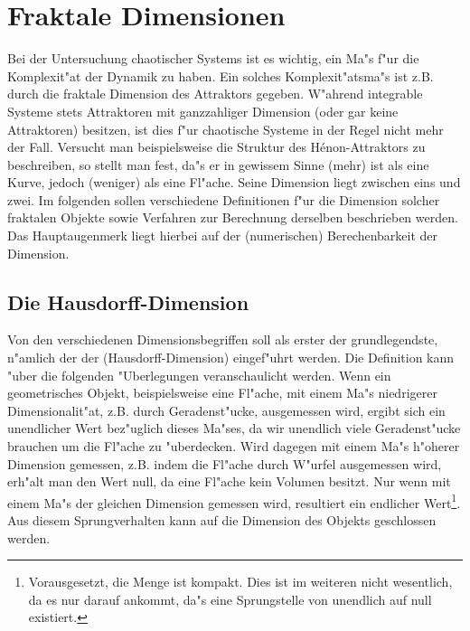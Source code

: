 \section{Fraktale Dimensionen}
\label{chapfracdim}
Bei der Untersuchung chaotischer Systems ist es wichtig, ein Ma"s f"ur die Komplexit"at der
Dynamik zu haben. Ein solches Komplexit"atsma"s ist z.B. durch die fraktale Dimension des
Attraktors gegeben. W"ahrend integrable Systeme stets Attraktoren mit ganzzahliger
Dimension (oder gar keine Attraktoren) besitzen, ist dies f"ur chaotische Systeme in der Regel nicht mehr der Fall.
Versucht man beispielsweise die Struktur des H\'enon-Attraktors zu beschreiben, so stellt
man fest, da"s er in gewissem Sinne \naja(mehr) ist als eine Kurve, jedoch \naja(weniger)
als eine Fl"ache. Seine Dimension liegt zwischen eins und zwei.  Im folgenden sollen
verschiedene Definitionen f"ur die Dimension solcher fraktalen Objekte sowie Verfahren zur
Berechnung derselben beschrieben werden.  Das Hauptaugenmerk liegt hierbei auf der
\begriff(numerischen) Berechenbarkeit der Dimension.

\subsection{Die Hausdorff-Dimension}
Von den verschiedenen Dimensionsbegriffen soll als erster der grundlegendste, n"amlich der
der \begriff(Hausdorff-Dimension) eingef"uhrt werden. Die Definition kann "uber die
folgenden "Uberlegungen veranschaulicht werden. Wenn ein geometrisches Objekt,
beispielsweise eine Fl"ache, mit einem Ma"s niedrigerer Dimensionalit"at, z.B. durch
Geradenst"ucke, ausgemessen wird, ergibt sich ein unendlicher Wert bez"uglich dieses
Ma"ses, da wir unendlich viele Geradenst"ucke brauchen um die Fl"ache zu "uberdecken. Wird
dagegen mit einem Ma"s h"oherer Dimension gemessen, z.B. indem die Fl"ache durch W"urfel
ausgemessen wird, erh"alt man den Wert null, da eine Fl"ache kein Volumen besitzt. Nur wenn mit
einem Ma"s der gleichen Dimension gemessen wird, resultiert ein endlicher
Wert\footnote{Vorausgesetzt, die Menge ist kompakt. Dies ist im weiteren nicht wesentlich,
  da es nur darauf ankommt, da"s eine Sprungstelle von unendlich auf null existiert.}. Aus
diesem Sprungverhalten kann auf die Dimension des Objekts geschlossen werden.

